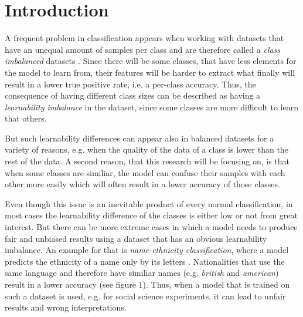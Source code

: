 \documentclass[journal]{IEEEtran}
\begin{document}
\begin{abstract}
\end{abstract}


\section{Introduction}
A frequent problem in classification appears when working with datasets that have an unequal amount of samples per class and are therefore called a \emph{class imbalanced} datasets \cite{japkowicz2002class}. %
Since there will be some classes, that have less elements for the model to learn from, their features will be harder to extract what finally will result in a lower true positive rate, i.e. a per-class accuracy.
Thus, the consequence of having different class sizes can be described as having a \emph{learnability imbalance} in the dataset, since some classes are more difficult to learn that others.

But such learnability differences can appear also in balanced datasets for a variety of reasons, e.g. when the quality of the data of a class is lower than the rest of the data. %
A second reason, that this research will be focusing on, is that when some classes are similiar,
the model can confuse their samples with each other more easily which will often result in a lower accuracy of those classes.

Even though this issue is an inevitable product of every normal classification, in most cases the learnability difference of the classes is either low or not from great interest.
But there can be more extreme cases in which a model needs to produce fair and unbiased results using a dataset that has an obvious learnability imbalance. 
An example for that is \emph{name-ethnicity classification}, where a model predicts the ethnicity of a name only by its letters \cite{mateos2007review}. 
Nationalities that use the same language and therefore have similiar names (e.g. \emph{british} and \emph{american}) result in a lower accuracy (see figure 1).
Thus, when a model that is trained on such a dataset is used, e.g. for social science experiments, it can lead to unfair results and wrong interpretations. 
\end{document}

